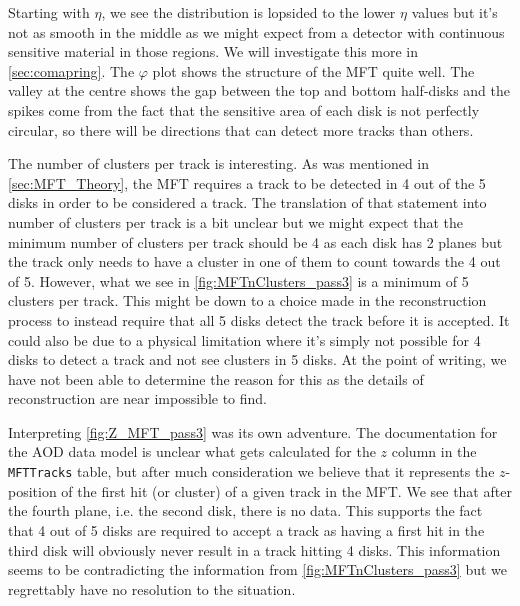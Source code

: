 Starting with $\eta$, we see the distribution is lopsided to the lower $\eta$ values but it's not as smooth in the middle as we might expect from a detector with continuous sensitive material in those regions. We will investigate this more in \cref{sec:comapring}. The $\varphi$ plot shows the structure of the MFT quite well. The valley at the centre shows the gap between the top and bottom half-disks and the spikes come from the fact that the sensitive area of each disk is not perfectly circular, so there will be directions that can detect more tracks than others. 

The number of clusters per track is interesting. As was mentioned in \cref{sec:MFT_Theory}, the MFT requires a track to be detected in 4 out of the 5 disks in order to be considered a track. The translation of that statement into number of clusters per track is a bit unclear but we might expect that the minimum number of clusters per track should be 4 as each disk has 2 planes but the track only needs to have a cluster in one of them to count towards the 4 out of 5. However, what we see in \cref{fig:MFTnClusters_pass3} is a minimum of 5 clusters per track. This might be down to a choice made in the reconstruction process to instead require that all 5 disks detect the track before it is accepted. It could also be due to a physical limitation where it's simply not possible for 4 disks to detect a track and not see clusters in 5 disks. At the point of writing, we have not been able to determine the reason for this as the details of reconstruction are near impossible to find.

Interpreting \cref{fig:Z_MFT_pass3} was its own adventure. The documentation for the AOD data model is unclear what gets calculated for the $z$ column in the \texttt{MFTTracks} table, but after much consideration we believe that it represents the $z$-position of the first hit (or cluster) of a given track in the MFT. We see that after the fourth plane, i.e. the second disk, there is no data. This supports the fact that 4 out of 5 disks are required to accept a track as having a first hit in the third disk will obviously never result in a track hitting 4 disks. This information seems to be contradicting the information from \cref{fig:MFTnClusters_pass3} but we regrettably have no resolution to the situation.

